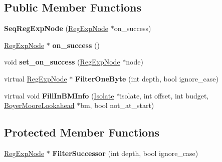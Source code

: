\subsection*{Public Member Functions}
\begin{DoxyCompactItemize}
\item 
{\bfseries Seq\+Reg\+Exp\+Node} (\hyperlink{classv8_1_1internal_1_1_reg_exp_node}{Reg\+Exp\+Node} $\ast$on\+\_\+success)\hypertarget{classv8_1_1internal_1_1_seq_reg_exp_node_ad6c7861c1161e0719546cb02c06879fd}{}\label{classv8_1_1internal_1_1_seq_reg_exp_node_ad6c7861c1161e0719546cb02c06879fd}

\item 
\hyperlink{classv8_1_1internal_1_1_reg_exp_node}{Reg\+Exp\+Node} $\ast$ {\bfseries on\+\_\+success} ()\hypertarget{classv8_1_1internal_1_1_seq_reg_exp_node_aade3ae76f2c2916714211c0742cfd739}{}\label{classv8_1_1internal_1_1_seq_reg_exp_node_aade3ae76f2c2916714211c0742cfd739}

\item 
void {\bfseries set\+\_\+on\+\_\+success} (\hyperlink{classv8_1_1internal_1_1_reg_exp_node}{Reg\+Exp\+Node} $\ast$node)\hypertarget{classv8_1_1internal_1_1_seq_reg_exp_node_ac45d92508b35fc098a43ee36f46cac29}{}\label{classv8_1_1internal_1_1_seq_reg_exp_node_ac45d92508b35fc098a43ee36f46cac29}

\item 
virtual \hyperlink{classv8_1_1internal_1_1_reg_exp_node}{Reg\+Exp\+Node} $\ast$ {\bfseries Filter\+One\+Byte} (int depth, bool ignore\+\_\+case)\hypertarget{classv8_1_1internal_1_1_seq_reg_exp_node_a18536dbe417eaf7233f1f4177518abf5}{}\label{classv8_1_1internal_1_1_seq_reg_exp_node_a18536dbe417eaf7233f1f4177518abf5}

\item 
virtual void {\bfseries Fill\+In\+B\+M\+Info} (\hyperlink{classv8_1_1internal_1_1_isolate}{Isolate} $\ast$isolate, int offset, int budget, \hyperlink{classv8_1_1internal_1_1_boyer_moore_lookahead}{Boyer\+Moore\+Lookahead} $\ast$bm, bool not\+\_\+at\+\_\+start)\hypertarget{classv8_1_1internal_1_1_seq_reg_exp_node_a1efe572aaf7a2199dddf1f4304723b20}{}\label{classv8_1_1internal_1_1_seq_reg_exp_node_a1efe572aaf7a2199dddf1f4304723b20}

\end{DoxyCompactItemize}
\subsection*{Protected Member Functions}
\begin{DoxyCompactItemize}
\item 
\hyperlink{classv8_1_1internal_1_1_reg_exp_node}{Reg\+Exp\+Node} $\ast$ {\bfseries Filter\+Successor} (int depth, bool ignore\+\_\+case)\hypertarget{classv8_1_1internal_1_1_seq_reg_exp_node_a3593e5af0b3f8ca04a685c59536db0be}{}\label{classv8_1_1internal_1_1_seq_reg_exp_node_a3593e5af0b3f8ca04a685c59536db0be}

\end{DoxyCompactItemize}
